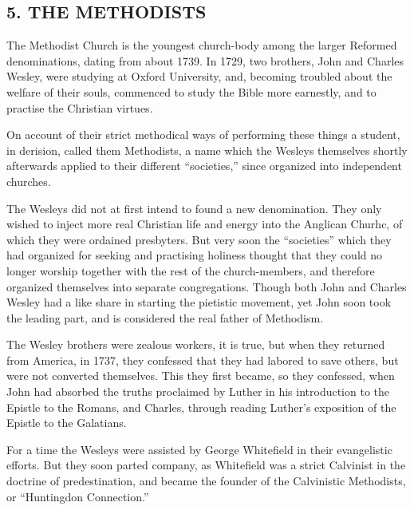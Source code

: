 \documentclass[
]{book}
\begin{document}
\hypertarget{the-methodists}{%
\subsection*{\texorpdfstring{5. THE METHODISTS}{5. THE METHODISTS}}\label{the-methodists}}

The Methodist Church is the youngest church-body among the larger Reformed denominations, dating from about 1739. In 1729, two brothers, John and Charles Wesley, were studying at Oxford University, and, becoming troubled about the welfare of their souls, commenced to study the Bible more earnestly, and to practise the Christian virtues.

On account of their strict methodical ways of performing these things a student, in derision, called them Methodists, a name which the Wesleys themselves shortly afterwards applied to their different ``societies,'' since organized into independent churches.

The Wesleys did not at first intend to found a new denomination. They only wished to inject more real Christian life and energy into the Anglican Churhc, of which they were ordained presbyters. But very soon the ``societies'' which they had organized for seeking and practising holiness thought that they could no longer worship together with the rest of the church-members, and therefore organized themselves into separate congregations. Though both John and Charles Wesley had a like share in starting the pietistic movement, yet John soon took the leading part, and is considered the real father of Methodism.

The Wesley brothers were zealous workers, it is true, but when they returned from America, in 1737, they confessed that they had labored to save others, but were not converted themselves. This they first became, so they confessed, when John had absorbed the truths proclaimed by Luther in his introduction to the Epistle to the Romans, and Charles, through reading Luther's exposition of the Epistle to the Galatians.

For a time the Wesleys were assisted by George Whitefield in their evangelistic efforts. But they soon parted company, as Whitefield was a strict Calvinist in the doctrine of predestination, and became the founder of the Calvinistic Methodists, or ``Huntingdon Connection.''
\end{document}
